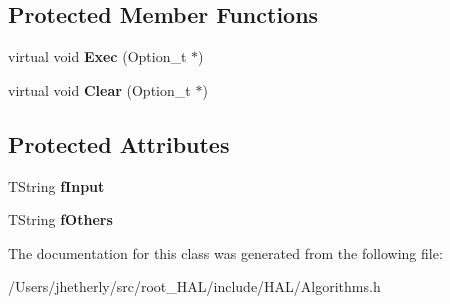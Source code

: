 \subsection*{Protected Member Functions}
\begin{DoxyCompactItemize}
\item 
\hypertarget{class_h_a_l_1_1internal_1_1_filter_ref_particle_algo_a7529e47021a80f442fe54eadfe78937e}{virtual void {\bfseries Exec} (Option\-\_\-t $\ast$)}\label{class_h_a_l_1_1internal_1_1_filter_ref_particle_algo_a7529e47021a80f442fe54eadfe78937e}

\item 
\hypertarget{class_h_a_l_1_1internal_1_1_filter_ref_particle_algo_ac96ab0229663d8cf8da2eec04dc784be}{virtual void {\bfseries Clear} (Option\-\_\-t $\ast$)}\label{class_h_a_l_1_1internal_1_1_filter_ref_particle_algo_ac96ab0229663d8cf8da2eec04dc784be}

\end{DoxyCompactItemize}
\subsection*{Protected Attributes}
\begin{DoxyCompactItemize}
\item 
\hypertarget{class_h_a_l_1_1internal_1_1_filter_ref_particle_algo_a209eca43e3c37e04360436a8f8d06107}{T\-String {\bfseries f\-Input}}\label{class_h_a_l_1_1internal_1_1_filter_ref_particle_algo_a209eca43e3c37e04360436a8f8d06107}

\item 
\hypertarget{class_h_a_l_1_1internal_1_1_filter_ref_particle_algo_a90112dd729802cc7265f7c223e8c18b8}{T\-String {\bfseries f\-Others}}\label{class_h_a_l_1_1internal_1_1_filter_ref_particle_algo_a90112dd729802cc7265f7c223e8c18b8}

\end{DoxyCompactItemize}


The documentation for this class was generated from the following file\-:\begin{DoxyCompactItemize}
\item 
/\-Users/jhetherly/src/root\-\_\-\-H\-A\-L/include/\-H\-A\-L/Algorithms.\-h\end{DoxyCompactItemize}
